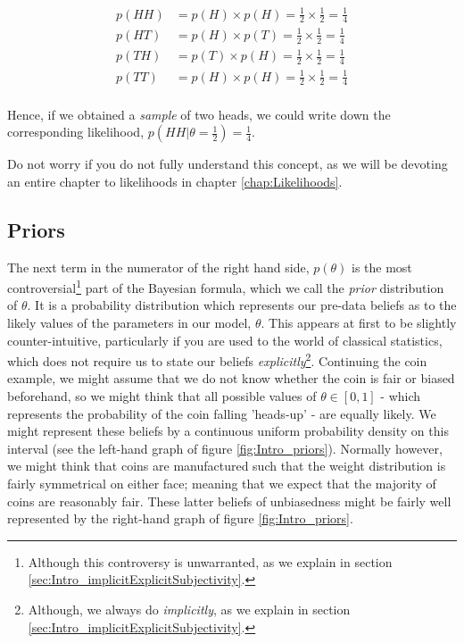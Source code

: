 \documentclass[11pt,fullpage]{book}
\begin{document}
\begin{equation}
\begin{align}
p(HH) &= p(H)\times p(H) = \frac{1}{2} \times \frac{1}{2} = \frac{1}{4}\\
p(HT) &= p(H)\times p(T) = \frac{1}{2} \times \frac{1}{2} = \frac{1}{4}\\
p(TH) &= p(T)\times p(H) = \frac{1}{2} \times \frac{1}{2} = \frac{1}{4}\\
p(TT) &= p(H)\times p(H) = \frac{1}{2} \times \frac{1}{2} = \frac{1}{4}\\
\end{align}
\end{equation}

Hence, if we obtained a \textit{sample} of two heads, we could write down the corresponding likelihood, $p(HH|\theta=\frac{1}{2})=\frac{1}{4}$.

Do not worry if you do not fully understand this concept, as we will be devoting an entire chapter to likelihoods in chapter \ref{chap:Likelihoods}.

\subsection{Priors}\label{sec:Intro_priors}
The next term in the numerator of the right hand side, $p(\theta)$ is the most controversial\footnote{Although this controversy is unwarranted, as we explain in section \ref{sec:Intro_implicitExplicitSubjectivity}.} part of the Bayesian formula, which we call the \textit{prior} distribution of $\theta$. It is a probability distribution which represents our pre-data beliefs as to the likely values of the parameters in our model, $\theta$. This appears at first to be slightly counter-intuitive, particularly if you are used to the world of classical statistics, which does not require us to state our beliefs \textit{explicitly}\footnote{Although, we always do \textit{implicitly}, as we explain in section \ref{sec:Intro_implicitExplicitSubjectivity}.}. Continuing the coin example, we might assume that we do not know whether the coin is fair or biased beforehand, so we might think that all possible values of $\theta\in[0,1]$ - which represents the probability of the coin falling 'heads-up' - are equally likely. We might represent these beliefs by a continuous uniform probability density on this interval (see the left-hand graph of figure \ref{fig:Intro_priors}). Normally however, we might think that coins are manufactured such that the weight distribution is fairly symmetrical on either face; meaning that we expect that the majority of coins are reasonably fair. These latter beliefs of unbiasedness might be fairly well represented by the right-hand graph of figure \ref{fig:Intro_priors}.
\end{document}
